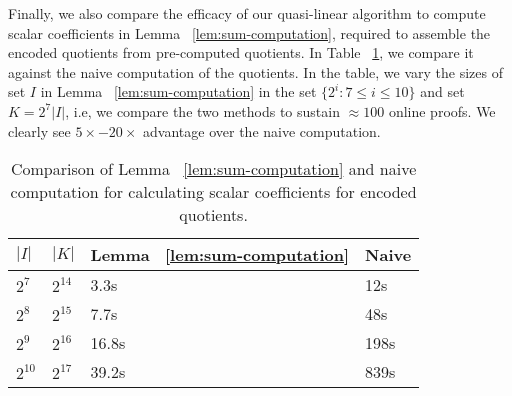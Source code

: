 Finally, we also compare the efficacy of our quasi-linear algorithm to compute scalar coefficients in
Lemma ~\ref{lem:sum-computation}, required to assemble the encoded quotients from pre-computed quotients.
In Table ~\ref{tbl:sum-computation-compare}, we compare it against the naive computation of the quotients.
In the table, we vary the sizes of set $I$ in Lemma ~\ref{lem:sum-computation} in the set $\{2^i:7\leq i\leq 10\}$
and set $K=2^7|I|$, i.e, we compare the two methods to sustain $\approx 100$ online proofs. We clearly see
$5\times-20\times$ advantage over the naive computation.

\begin{table}[htbp]
    \centering
    \begin{tabularx}{0.45\textwidth}{@{}XXXX@{}}
        \toprule
         $|I|$ & $|K|$ & Lemma ~\ref{lem:sum-computation} & Naive \\ \midrule
        $2^7$ & $2^{14}$ & 3.3s  & 12s \\
        $2^8$ & $2^{15}$ & 7.7s  & 48s \\
        $2^9$ & $2^{16}$ & 16.8s & 198s \\
        $2^{10}$ & $2^{17}$ & 39.2s & 839s \\
        \bottomrule
    \end{tabularx}
    \caption{Comparison of Lemma ~\ref{lem:sum-computation} and naive computation for calculating
    scalar coefficients for encoded quotients.}
    \label{tbl:sum-computation-compare}
\end{table}




